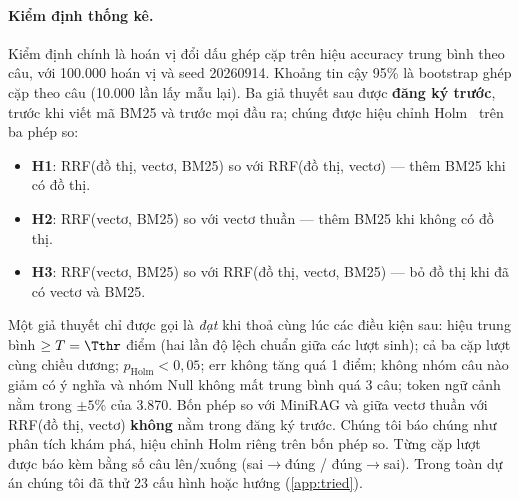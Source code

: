 \paragraph{Kiểm định thống kê.}
Kiểm định chính là hoán vị đổi dấu ghép cặp trên hiệu accuracy trung bình theo câu, với 100.000 hoán vị và seed 20260914.
Khoảng tin cậy 95\% là bootstrap ghép cặp theo câu (10.000 lần lấy mẫu lại).
Ba giả thuyết sau được \textbf{đăng ký trước}, trước khi viết mã BM25 và trước mọi đầu ra; chúng được hiệu chỉnh Holm~\cite{holm1979} trên ba phép so:
\begin{itemize}
  \item \textbf{H1}: RRF(đồ thị, vectơ, BM25) so với RRF(đồ thị, vectơ) --- thêm BM25 khi có đồ thị.
  \item \textbf{H2}: RRF(vectơ, BM25) so với vectơ thuần --- thêm BM25 khi không có đồ thị.
  \item \textbf{H3}: RRF(vectơ, BM25) so với RRF(đồ thị, vectơ, BM25) --- bỏ đồ thị khi đã có vectơ và BM25.
\end{itemize}
Một giả thuyết chỉ được gọi là \emph{đạt} khi thoả cùng lúc các điều kiện sau: hiệu trung bình $\ge T = \Tthr$ điểm (hai lần độ lệch chuẩn giữa các lượt sinh); cả ba cặp lượt cùng chiều dương; $p_{\text{Holm}} < 0{,}05$; err không tăng quá 1 điểm; không nhóm câu nào giảm có ý nghĩa và nhóm Null không mất trung bình quá 3 câu; token ngữ cảnh nằm trong $\pm 5\%$ của 3.870.
Bốn phép so với MiniRAG và giữa vectơ thuần với RRF(đồ thị, vectơ) \textbf{không} nằm trong đăng ký trước. Chúng tôi báo chúng như phân tích khám phá, hiệu chỉnh Holm riêng trên bốn phép so.
Từng cặp lượt được báo kèm bằng số câu lên/xuống (sai$\to$đúng / đúng$\to$sai).
Trong toàn dự án chúng tôi đã thử 23 cấu hình hoặc hướng (\cref{app:tried}).

